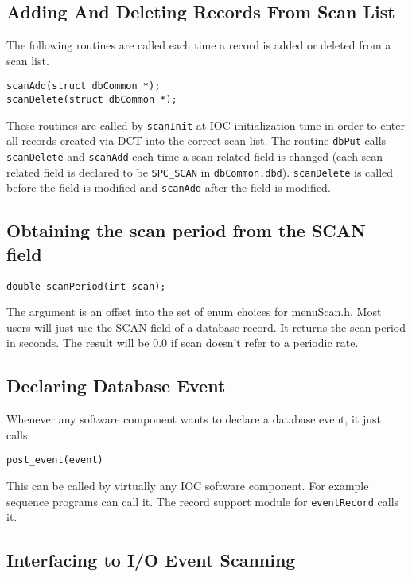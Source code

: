 \subsection{Adding And Deleting Records From Scan List}

The following routines are called each time a record is added or deleted from a scan list.

\begin{verbatim}scanAdd(struct dbCommon *);
scanDelete(struct dbCommon *);
\end{verbatim}
These routines are called by \verb|scanInit| at IOC initialization time in order to enter all records created via DCT into the 
correct scan list. The routine \verb|dbPut| calls \verb|scanDelete| and \verb|scanAdd| each time a scan related field is changed (each 
scan related field is declared to be \verb|SPC_SCAN| in  \verb|dbCommon.dbd|). \verb|scanDelete| is called before the field is modified 
and \verb|scanAdd| after the field is modified.

\subsection{Obtaining the scan period from the SCAN field}

\begin{verbatim}double scanPeriod(int scan);
\end{verbatim}The argument is an offset into the set of enum choices for menuScan.h. Most users will just use the SCAN field of a 
database record. It returns the scan period in seconds. The result will be 0.0 if  scan doesn't refer to a periodic rate.

\subsection{Declaring Database Event}

Whenever any software component wants to declare a database event, it just calls:

\begin{verbatim}post_event(event)
\end{verbatim}This can be called by virtually any IOC software component. For example sequence programs can call it. The record 
support module for \verb|eventRecord| calls it.

\subsection{Interfacing to I/O Event Scanning}

